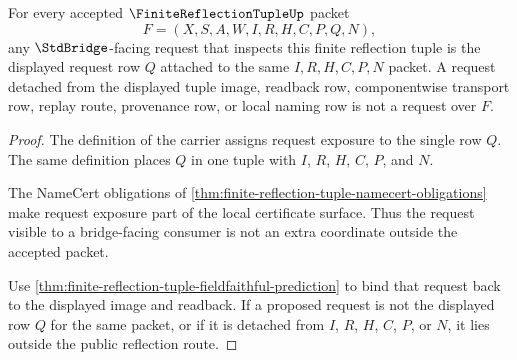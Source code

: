 \begin{theorem}
\label{thm:finite-reflection-tuple-request-exhaustion}
For every accepted $\FiniteReflectionTupleUp$ packet
$$
F=(X,S,A,W,I,R,H,C,P,Q,N),
$$
any $\StdBridge$-facing request that inspects this finite reflection tuple is the displayed request row $Q$ attached to the same $I,R,H,C,P,N$ packet. A request detached from the displayed tuple image, readback row, componentwise transport row, replay route, provenance row, or local naming row is not a request over $F$.
\end{theorem}
\begin{proof}
The definition of the carrier assigns request exposure to the single row $Q$. The same definition places $Q$ in one tuple with $I$, $R$, $H$, $C$, $P$, and $N$.

The NameCert obligations of \autoref{thm:finite-reflection-tuple-namecert-obligations} make request exposure part of the local certificate surface. Thus the request visible to a bridge-facing consumer is not an extra coordinate outside the accepted packet.

Use \autoref{thm:finite-reflection-tuple-fieldfaithful-prediction} to bind that request back to the displayed image and readback. If a proposed request is not the displayed row $Q$ for the same packet, or if it is detached from $I$, $R$, $H$, $C$, $P$, or $N$, it lies outside the public reflection route.
\end{proof}


